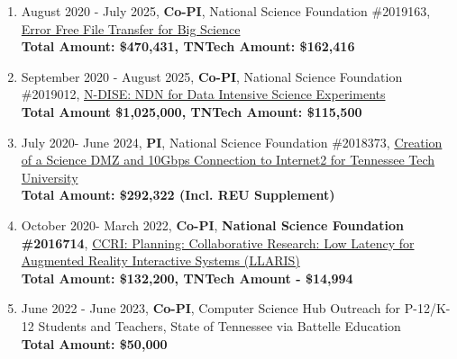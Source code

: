 \begin{enumerate}

\item August 2020 - July 2025, \textbf{Co-PI}, National Science Foundation \#2019163, \href{https://www.nsf.gov/awardsearch/showAward?AWD_ID=2019163}{Error Free File Transfer for Big Science} \\ \textbf{Total Amount: \$470,431, TNTech Amount: \$162,416}


\item September 2020 - August 2025, \textbf{Co-PI}, National Science Foundation \#2019012,  \href{https://www.nsf.gov/awardsearch/showAward?AWD_ID=2019012}{N-DISE: NDN for Data Intensive Science Experiments}
\\\textbf{Total Amount \$1,025,000, TNTech Amount: \$115,500}

\item July 2020- June 2024, \textbf{PI}, National Science Foundation \#2018373, \href{https://www.nsf.gov/awardsearch/showAward?AWD_ID=2018373}{Creation of a Science DMZ and 10Gbps Connection to Internet2 for Tennessee Tech University}  \\\textbf{Total Amount: \$292,322 (Incl. REU Supplement)}

\item October 2020- March 2022, \textbf{Co-PI}, \textbf{National Science Foundation \#2016714}, \href{https://www.nsf.gov/awardsearch/showAward?AWD_ID=2016714}{CCRI: Planning: Collaborative Research: Low Latency for Augmented Reality Interactive Systems (LLARIS)}\\ \textbf{Total Amount: \$132,200, TNTech Amount - \$14,994 }


\item June 2022 - June 2023, \textbf{Co-PI}, Computer Science Hub Outreach for P-12/K-12 Students and Teachers, State of Tennessee via Battelle Education\\  \textbf{Total Amount: \$50,000}


\end{enumerate}
